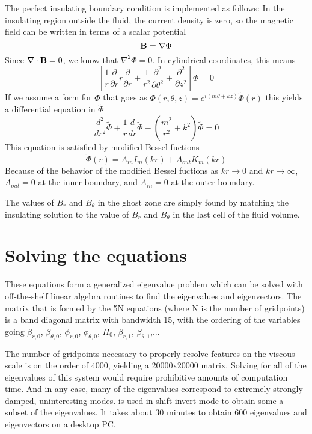\documentclass[letterpaper]{article}
\begin{document}
The perfect insulating boundary condition is implemented as follows:
In the insulating region outside the fluid, the current density is
zero, so the magnetic field can be written in terms of a scalar
potential
\begin{equation}
{\bf B} = {\bf \nabla}\Phi
\end{equation}
Since ${\bf \nabla}\cdot{\bf B} = 0$, we know that $\nabla^2 \Phi = 0$.  In cylindrical coordinates, this means
\begin{equation}
\left[\frac{1}{r}\frac{\partial}{\partial r}r\frac{\partial}{\partial r} + \frac{1}{r^2}\frac{\partial^2}{\partial\theta^2} +\frac{\partial^2}{\partial z^2}\right]\Phi = 0
\end{equation}
If we assume a form for $\Phi$ that goes as $\Phi(r,\theta,z) = e^{i(m\theta + k z)}\tilde{\Phi}(r)$
this yields a differential equation in $\tilde{\Phi}$
\begin{equation}
\frac{d^2}{d r^2}\tilde{\Phi} + \frac{1}{r}\frac{d}{dr}\tilde{\Phi} - \left(\frac{m^2}{r^2} + k^2\right)\tilde{\Phi} = 0
\end{equation}
This equation is satisfied by modified Bessel fuctions
\begin{equation}
\tilde{\Phi}(r) = A_{in} I_m (k r) + A_{out} K_m (k r)
\end{equation}
Because of the behavior of the modified Bessel fuctions as $k r
\rightarrow 0$ and $k r \rightarrow \infty$, $A_{out} = 0$ at the
inner boundary, and $A_{in} = 0$ at the outer boundary.

The values of $B_r$ and $B_\theta$ in the ghost zone are simply found
by matching the insulating solution to the value of $B_r$ and
$B_\theta$ in the last cell of the fluid volume.

\section{Solving the equations}

These equations form a generalized eigenvalue problem which can be
solved with off-the-shelf linear algebra routines to find the
eigenvalues and eigenvectors.  The matrix that is formed by the 5N
equations (where N is the number of gridpoints) is a band diagonal
matrix with bandwidth 15, with the ordering of the variables going
$\beta_{r,0}$, $\beta_{\theta,0}$, $\phi_{r,0}$, $\phi_{\theta,0}$,
$\Pi_0$, $\beta_{r,1}$, $\beta_{\theta,1}$,...

The number of gridpoints necessary to properly resolve features on the
viscous scale is on the order of 4000, yielding a 20000x20000 matrix.
Solving for all of the eigenvalues of this system would require
prohibitive amounts of computation time.  And in any case, many of the
eigenvalues correspond to extremely strongly damped, uninteresting
modes.  \verb@ARPACK@ is used in shift-invert mode to obtain some a
subset of the eigenvalues.  It takes about 30 minutes to obtain 600
eigenvalues and eigenvectors on a desktop PC.
\end{document}
